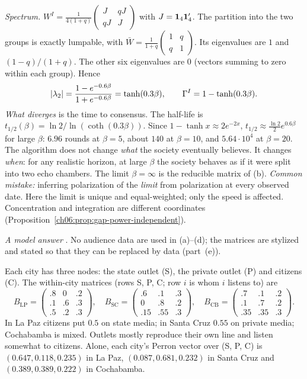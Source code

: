\documentclass[../solutions_manual.tex]{subfiles}
\begin{document}
\emph{Spectrum.} $W^I = \frac{1}{4(1+q)}\begin{pmatrix} J & qJ \\ qJ & J\end{pmatrix}$ with $J = \mathbf{1}_4\mathbf{1}_4'$. The partition into the two groups is exactly lumpable, with $\bar W = \frac{1}{1+q}\begin{pmatrix}1 & q\\ q & 1\end{pmatrix}$. Its eigenvalues are $1$ and $(1-q)/(1+q)$. The other six eigenvalues are $0$ (vectors summing to zero within each group). Hence
\[
|\lambda_2| = \frac{1 - e^{-0.6\beta}}{1 + e^{-0.6\beta}} = \tanh(0.3\beta), \qquad \Gamma^I = 1 - \tanh(0.3\beta) .
\]
\emph{What diverges} is the time to consensus. The half-life is $t_{1/2}(\beta) = \ln 2/\ln(\coth(0.3\beta))$. Since $1 - \tanh x \approx 2e^{-2x}$, $t_{1/2} \approx \frac{\ln 2}{2}e^{0.6\beta}$ for large $\beta$: $6.96$ rounds at $\beta = 5$, about $140$ at $\beta = 10$, and $5.64\cdot10^4$ at $\beta = 20$. The algorithm does not change \emph{what} the society eventually believes. It changes \emph{when}: for any realistic horizon, at large $\beta$ the society behaves as if it were split into two echo chambers. The limit $\beta = \infty$ is the reducible matrix of (b). \emph{Common mistake:} inferring polarization of the \emph{limit} from polarization at every observed date. Here the limit is unique and equal-weighted; only the speed is affected. Concentration and integration are different coordinates (Proposition~\ref{ch06:prop:gap-power-independent}).


\emph{A model answer} \illustrative. No audience data are used in (a)--(d); the matrices are stylized and stated so that they can be replaced by data (part~(e)).

 Each city has three nodes: the state outlet (S), the private outlet (P) and citizens (C). The within-city matrices (rows S, P, C; row $i$ is whom $i$ listens to) are
\[
B_{\text{LP}} = \begin{pmatrix} .8 & 0 & .2\\ .1 & .6 & .3\\ .5 & .2 & .3\end{pmatrix},\quad
B_{\text{SC}} = \begin{pmatrix} .6 & .1 & .3\\ 0 & .8 & .2\\ .15 & .55 & .3\end{pmatrix},\quad
B_{\text{CB}} = \begin{pmatrix} .7 & .1 & .2\\ .1 & .7 & .2\\ .35 & .35 & .3\end{pmatrix}.
\]
In La Paz citizens put $0.5$ on state media; in Santa Cruz $0.55$ on private media; Cochabamba is mixed. Outlets mostly reproduce their own line and listen somewhat to citizens. Alone, each city's Perron vector over (S, P, C) is $(0.647, 0.118, 0.235)$ in La Paz, $(0.087, 0.681, 0.232)$ in Santa Cruz and $(0.389, 0.389, 0.222)$ in Cochabamba.
\end{document}
